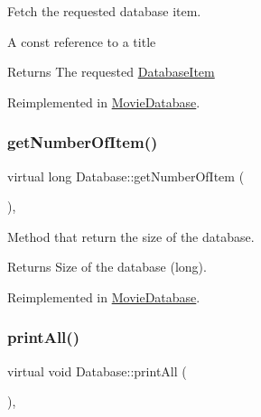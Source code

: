 Fetch the requested database item. 

A const reference to a title

\begin{DoxyReturn}{Returns}
The requested \hyperlink{classDatabaseItem}{Database\+Item}
\end{DoxyReturn}


Reimplemented in \hyperlink{classMovieDatabase_ac0bb39b8be599ffea76081809ae42dda}{Movie\+Database}.

\mbox{\label{classDatabase_a230225cb341eb23a99a83ef3d1abae53}} 
\subsubsection{\texorpdfstring{get\+Number\+Of\+Item()}{getNumberOfItem()}}
{\footnotesize\ttfamily virtual long Database\+::get\+Number\+Of\+Item (\begin{DoxyParamCaption}{ }\end{DoxyParamCaption})\hspace{0.3cm}{\ttfamily [inline]}, {\ttfamily [virtual]}}



Method that return the size of the database. 

\begin{DoxyReturn}{Returns}
Size of the database (long).
\end{DoxyReturn}


Reimplemented in \hyperlink{classMovieDatabase_a9a386f51dd72d63414a124cbcfcd879b}{Movie\+Database}.

\mbox{\label{classDatabase_afa345da530fd5c8dfe0c978917cd6049}} 
\subsubsection{\texorpdfstring{print\+All()}{printAll()}}
{\footnotesize\ttfamily virtual void Database\+::print\+All (\begin{DoxyParamCaption}{ }\end{DoxyParamCaption})\hspace{0.3cm}{\ttfamily [inline]}, {\ttfamily [virtual]}}



